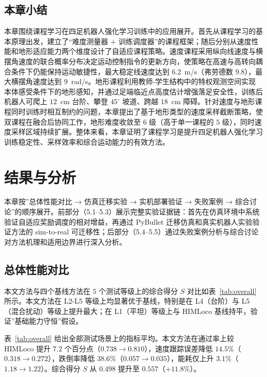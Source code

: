 \documentclass[12pt,a4paper]{ctexart}
\numberwithin{equation}{section}
\numberwithin{table}{section}
\numberwithin{figure}{section}
\newcommand{\subtopic}[1]{\par\addvspace{0.2\baselineskip}\ignorespaces}
\begin{document}
\subsection{本章小结}
本章围绕课程学习在四足机器人强化学习训练中的应用展开。首先从课程学习的基本原理出发，建立了“难度测量器 + 训练调度器”的课程框架；随后分别从速度性能和地形适应能力两个维度设计了自适应课程策略。速度课程采用纵向线速度与横摆角速度的联合概率分布决定运动控制指令的更新方向，使策略在高速与高转向耦合条件下仍能保持运动敏捷性，最大稳定线速度达到 $6.2$~m/s（弗劳德数 $9.8$），最大横摆角速度达到 $9$~rad/s。地形课程利用教师-学生结构中的特权观测空间实现本体感受条件下的地形感知，并通过足端临近点高度估计增强落足安全性，训练后机器人可爬上 $12$~cm 台阶、攀登 $45^\circ$ 坡道、跨越 $18$~cm 障碍。针对速度与地形课程同时训练时相互制约的问题，本章提出了基于地形类型的速度采样截断策略，使双课程在融合后协同工作，地形难度收敛至 $6$ 级（高于单一课程的 $5$ 级），同时速度采样区域持续扩展。整体来看，本章证明了课程学习是提升四足机器人强化学习训练稳定性、采样效率和综合运动能力的有效方法。


\clearpage
\section{结果与分析}\label{sec:results}
本章按”总体性能对比 → 仿真迁移实验 → 实机部署验证 → 失败案例 → 综合讨论”的顺序展开。前部分（5.1–5.3）展示完整实验证据链：首先在仿真环境中系统验证自适应奖励调度的相对增益，再通过 PyBullet 迁移仿真和真实机器人实验验证方法的 sim-to-real 可迁移性；后部分（5.4–5.5）通过失败案例分析与综合讨论对方法机理和适用边界进行深入分析。

\subsection{总体性能对比}
\subtopic{综合得分与场景分布}
本文方法与四个基线方法在 $5$ 个测试等级上的综合得分 $S$ 对比如表~\ref{tab:overall} 所示。本文方法在 L2-L5 等级上均显著优于基线，特别是在 L4（台阶）与 L5（混合扰动）等级上提升最大；在 L1（平坦）等级上与 HIMLoco 基线持平，验证”基础能力守恒”假设。

\subtopic{主指标平均}
表~\ref{tab:overall} 给出全部测试场景上的指标平均。本文方法在通过率上较 HIMLoco 提升 $7.2$ 个百分点（$0.738\to 0.810$），速度跟踪误差降低 $14.5\%$（$0.318\to 0.272$），跌倒率降低 $38.6\%$（$0.057\to 0.035$），能耗仅上升 $3.1\%$（$1.18\to 1.22$）。综合得分 $S$ 从 $0.498$ 提升至 $0.557$（$+11.8\%$）。
\end{document}
